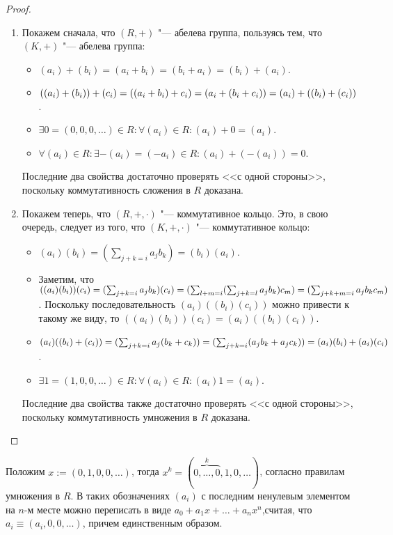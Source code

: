 \begin{proof}~
	\begin{enumerate}
		\item Покажем сначала, что $(R, +)$ "--- абелева группа, пользуясь тем, что $(K, +)$ "--- абелева группа:
		\begin{itemize}
			\item $(a_i) + (b_i) = (a_i + b_i) = (b_i + a_i) = (b_i) + (a_i)$.
			\item $((a_i) + (b_i)) + (c_i) = ((a_i + b_i) + c_i) = (a_i + (b_i + c_i)) \hm{=} (a_i) + ((b_i) + (c_i))$.
			\item $\exists 0 = (0, 0, 0, \dots) \in R: \forall (a_i) \in R: (a_i) + 0 = (a_i)$.
			\item $\forall (a_i) \in R: \exists -(a_i) = (-a_i) \in R: (a_i) + (-(a_i)) = 0$.
		\end{itemize}
	
		Последние два свойства достаточно проверять <<с одной стороны>>, поскольку коммутативность сложения в $R$ доказана.
		
		\item Покажем теперь, что $(R, +, \cdot)$ "--- коммутативное кольцо. Это, в свою очередь, следует из того, что $(K, +, \cdot)$ "--- коммутативное кольцо:
		\begin{itemize}
			\item $(a_i)(b_i) = (\sum_{j + k = i}a_jb_k) = (b_i)(a_i)$.
			
			\item Заметим, что $((a_i)(b_i))(c_i) = (\sum_{j + k = i}a_jb_k)(c_i) = (\sum_{l + m = i}(\sum_{j + k = l}a_jb_k)c_m) \hm{=} (\sum_{j+k+m = i}a_jb_kc_m)$. Поскольку последовательность $(a_i)((b_i)(c_i))$ можно привести к такому же виду, то $((a_i)(b_i))(c_i) = (a_i)((b_i)(c_i))$.
			\item $(a_i)((b_i) + (c_i)) = (\sum_{j + k = i}a_j(b_k + c_k)) = (\sum_{j + k = i}(a_jb_k + a_jc_k)) \hm{=} (a_i)(b_i) + (a_i)(c_i)$.
			\item $\exists 1 = (1, 0, 0, \dots) \in R: \forall (a_i) \in R: (a_i)1 = (a_i)$.
		\end{itemize}
	
		Последние два свойства также достаточно проверять <<с одной стороны>>, поскольку коммутативность умножения в $R$ доказана.\qedhere
	\end{enumerate}
\end{proof}

\begin{note}
	Положим $x := (0, 1, 0, 0, \dots)$, тогда $x^k = (\overbrace{0, \dots, 0}^{k}, 1, 0, \dots)$, согласно правилам умножения в $R$. В таких обозначениях $(a_i)$ с последним ненулевым элементом на $n$-м месте можно переписать в виде $a_0 + a_1x + \dots + a_nx^n$,считая, что $a_i \equiv (a_i, 0, 0,\dots)$, причем единственным образом.
\end{note}

